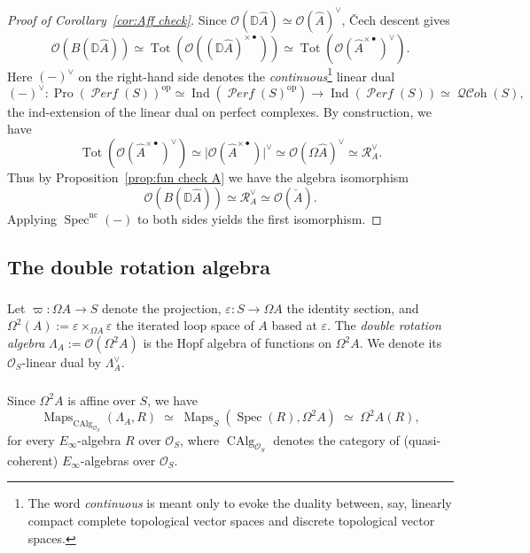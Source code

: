 \documentclass[12pt, oneside]{amsart}
\numberwithin{equation}{section}
\theoremstyle{remark}
\theoremstyle{plain}
\DeclareMathOperator{\QCOH}{\mathcal{QC}\textit{oh}}
\DeclareMathOperator{\PERF}{\mathcal{P}\textit{erf}}
\DeclareMathOperator{\Map}{Maps}
\newcommand{\R}{\mathcal{R}}
\newcommand{\RA}{\R_A}
\newcommand{\lam}{\Lambda}
\newcommand{\lamco}{\Lambda^\vee}
\newcommand{\OO}{\mathcal{O}}
\DeclareMathOperator{\spc}{Spec}
\newcommand{\Specnc}{\operatorname{Spec}^{\mathrm{nc}}}
\newcommand{\CAlg}{\operatorname{CAlg}}
\newcommand{\Ind}{\operatorname{Ind}}
\newcommand{\eps}{\varepsilon}
\begin{document}
\begin{proof}[Proof of Corollary~\ref{cor:Aff check}]
  Since $\OO(\mathbb{D}\widehat{A}) \simeq \OO(\widehat{A})^\vee$, \v{C}ech descent gives
  \[
    \OO(B(\mathbb{D}\widehat{A}))
    \simeq \operatorname{Tot}(\OO((\mathbb{D}\widehat{A})^{\times \bullet}))
    \simeq \operatorname{Tot}(\OO(\widehat{A}^{\times \bullet})^\vee).
  \]
  Here $(-)^\vee$ on the right-hand side denotes the \emph{continuous}\footnote{The word \emph{continuous} is meant only to evoke the duality between, say, linearly compact complete topological vector spaces and discrete topological vector spaces.} linear dual
  \[
    (-)^\vee : \operatorname{Pro}(\PERF(S))^{\mathrm{op}}
    \simeq \Ind(\PERF(S)^{\mathrm{op}})
    \to \Ind(\PERF(S)) \simeq \QCOH(S),
  \]
  the ind-extension of the linear dual on perfect complexes.
  By construction, we have
  \[
    \operatorname{Tot}(\OO(\widehat{A}^{\times \bullet})^\vee)
    \simeq \big| \OO(\widehat{A}^{\times \bullet}) \big|^\vee
    \simeq \OO(\Omega\widehat{A})^\vee
    \simeq \RA^\vee.
  \]
  Thus by Proposition~\ref{prop:fun check A} we have the algebra isomorphism
  \[
    \OO(B(\mathbb{D}\widehat{A}))
    \simeq \RA^\vee
    \simeq \OO(\check{A}).
  \]
  Applying $\Specnc(-)$ to both sides yields the first isomorphism.
\end{proof}

\subsection{The double rotation algebra}\label{ssec:modules}

\subsubsection{}

Let $\varpi : \Omega A \to S$ denote the projection, $\eps : S \to \Omega A$ the identity section, and $\Omega^2(A) := \eps \times_{\Omega A} \eps$ the iterated loop space of $A$ based at $\eps$.
The \emph{double rotation algebra} $\lam_A := \OO(\Omega^2 A)$ is the Hopf algebra of functions on $\Omega^2 A$. We denote its $\OO_S$-linear dual by $\lamco_A$.

\subsubsection{}\label{sssec:maps out of lam}

Since $\Omega^2 A$ is affine over $S$, we have
\begin{equation*}
	\Map_{\CAlg_{\OO_S}}(\lam_A, R) \;\simeq\; \Map_S(\spc(R), \Omega^2 A) \;\simeq\; \Omega^2 A(R),
\end{equation*}
for every $E_\infty$-algebra $R$ over $\OO_S$, where $\CAlg_{\OO_S}$ denotes the category of (quasi-coherent) $E_\infty$-algebras over $\OO_S$.
\end{document}
